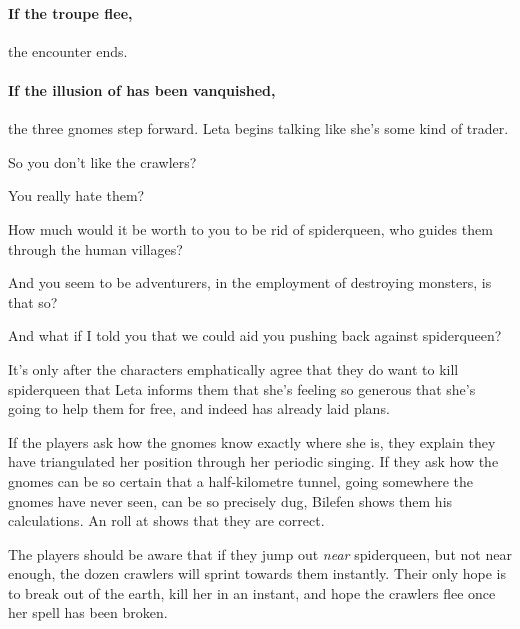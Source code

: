 \paragraph{If the troupe flee,}
the encounter ends.

\paragraph{If the illusion of  has been vanquished,}
the three gnomes step forward.
Leta begins talking like she's some kind of trader.

\begin{speechtext}
  So you don't like the \glspl{crawler}?

  You really hate them?

  How much would it be worth to you to be rid of \gls{spiderqueen}, who guides them through the human \glspl{village}?

  And you seem to be adventurers, in the employment of destroying monsters, is that so?

  And what if I told you that we could aid you pushing back against \gls{spiderqueen}?
\end{speechtext}

It's only after the characters emphatically agree that they do want to kill \gls{spiderqueen} that Leta informs them that she's feeling so generous that she's going to help them for free, and indeed has already laid plans.

If the players ask how the gnomes know exactly where she is, they explain they have triangulated her position through her periodic singing.
If they ask how the gnomes can be so certain that a half-kilometre tunnel, going somewhere the gnomes have never seen, can be so precisely dug, Bilefen shows them his calculations.
An  roll at \tn[11] shows that they are correct.

The players should be aware that if they jump out \emph{near} \gls{spiderqueen}, but not near enough, the dozen \glspl{crawler} will sprint towards them instantly.
Their only hope is to break out of the earth, kill her in an instant, and hope the \glspl{crawler} flee once her spell has been broken.

